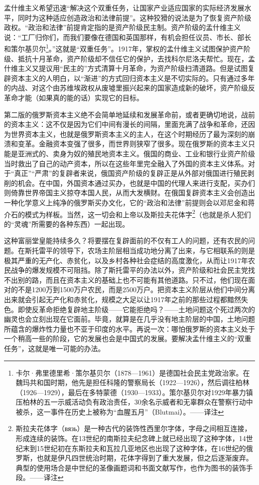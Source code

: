 \documentclass[UTF8, 12pt, a4paper]{ctexrep}
\begin{document}
孟什维主义希望迅速“解决这个双重任务，让国家产业适应国家的实际经济发展水平，同时为这种适应创造政治和法律前提”。这种狡猾的说法是为了恢复资产阶级政权。“政治和法律”前提肯定指的是资产阶级民主制。资产阶级的孟什维主义说：“工厂归你们，而我们要像在德国和英国那样，有机会担任议员、市长、部长和策尔基贝尔\footnote{卡尔·弗里德里希·策尔基贝尔（1878—1961）是德国社会民主党政治家。在魏玛共和国时期，他先是担任科隆的警察局长（1922—1926），然后调往柏林（1926—1929），最后在多特蒙德（1930—1933）。策尔基贝尔对1929年暴力镇压柏林的五一示威活动负有政治责任，30余名示威者和无辜群众在警察行动中被杀，这一事件在历史上被称为“血腥五月”（Blutmai）。——译注}。”这就是“双重任务”。1917年，掌权的孟什维主义试图保护资产阶级、抵抗十月革命，资产阶级却不信任它的保护，去找科尔尼洛夫帮忙。现在，孟什维主义又提议用“民主的”方式清算十月革命，为资产阶级扫清道路。但是试图复辟资本主义的人明白，以“渐进”的方式回归资本主义是不切实际的。只有通过多年的内战、对这个由苏维埃政权从废墟里振兴起来的国家造成新的破坏，资产阶级反革命才能（如果真的能的话）实现它的目标。

第二版的俄罗斯资本主义绝不会简单地延续和发展革命前，或者更确切地说，战前的资本主义：这不仅是因为它们中间有漫长的间隔，里面充满了战争和革命，还因为世界资本主义，也就是俄罗斯资本主义的主人，在这个时期经历了最为深刻的崩溃和变革。金融资本变强了很多，而世界则狭窄了很多。现在俄罗斯的资本主义只能是亚洲式的、卖身为奴的殖民地资本主义。俄国的商业、工业和银行业资产阶级当时救出了自己的动产资本，所以在这些年里完全融入了外国的资本主义体系。对于“真正”“严肃”的复辟者来说，俄国资产阶级的复辟正是从外部对俄国进行殖民剥削的机会。在中国，外国资本通过买办，也就是中国的代理人来进行支配，买办们则倚靠世界帝国主义掠夺本国人民，从而大发横财。在俄国复辟资本主义会创造出一种化学意义上纯净的俄罗斯买办文化，它的“政治和法律”前提则会以邓尼金和蒋介石的模式为样板。当然，这一切会和上帝以及斯拉夫花体字\footnote{斯拉夫花体字（вязь）是一种古代的装饰性西里尔字体，字母之间相互连接，形成连续的装饰。在13世纪的南斯拉夫纪念碑上就已经出现了这种字体，14世纪末到15世纪初在东斯拉夫和瓦拉几亚地区也出现了这种字体，在16世纪的俄罗斯，也就是伊凡四世统治时期，花体字得到了重大发展，但之后逐渐废弃。典型的使用场合是中世纪的圣像画题词和书面文献写作，也作为图书的装饰手段。——译注}（也就是杀人犯们的“灵魂”所需要的各种东西）一起出现。

这种富丽堂皇能持续多久？将要摆在复辟面前的不仅有工人的问题，还有农民的问题。在斯托雷平的领导下，农场主阶层相当成功地分离了出来，与它相联系的则是极其严重的无产化、赤贫化，以及乡村各种社会症结的高度激化，从而让1917年农民战争的爆发规模不可阻挡。除了斯托雷平的办法以外，资产阶级和社会民主党找不出别的路，而且在资本主义的基础上也不可能有其他道路。只不过，他们现在面对的不是1200万到1500万户农民，而是2500万户。把资本主义阶层从他们中间分离出来就会引起无产化和赤贫化，规模之大足以让1917年之前的那些过程都黯然失色。即使反革命拒绝复辟地主阶级——它能拒绝吗？——土地问题这个死过两次的幽灵也会立刻出现在它面前。毕竟，就算是在几乎没有地主阶层的中国，土地问题所蕴含的爆炸性力量也不亚于印度的水平。再说一次：哪怕俄罗斯的资本主义处于一个稍高一些的阶段，它的发展也会是中国式的发展。要解决孟什维主义的“双重任务”，这就是唯一可能的办法。
\end{document}
